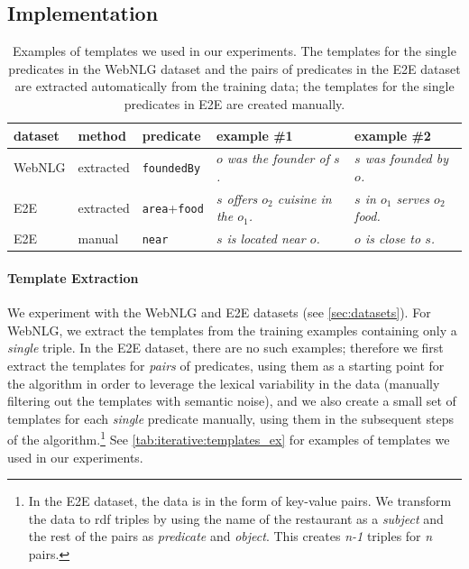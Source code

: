 \subsection{Implementation}
\label{sec:iterative:implementation}

\begin{table}[t]
    \centering\footnotesize
    \begin{tabular}{lllll}
        \textbf{dataset} & \textbf{method} & \textbf{predicate}          & \textbf{example \#1}                            & \textbf{example \#2}                     \\\midrule
        WebNLG           & extracted       & \texttt{foundedBy}          & \textit{$o$ was the founder of $s$.}            & \textit{$s$ was founded by $o$.}         \\
        E2E              & extracted       & \texttt{area}+\texttt{food} & \textit{$s$ offers $o_2$ cuisine in the $o_1$.} & \textit{$s$ in $o_1$ serves $o_2$ food.} \\
        E2E              & manual          & \texttt{near}               & \textit{$s$ is located near $o$.}               & \textit{$o$ is close to $s$.}
    \end{tabular}
    \caption{Examples of templates we used in our experiments. The templates for the single predicates in the WebNLG dataset and the pairs of predicates in the E2E dataset are extracted automatically from the training data; the templates for the single predicates in E2E are created manually.}
    \label{tab:iterative:templates_ex}
\end{table}


\paragraph{Template Extraction} We experiment with the WebNLG and E2E datasets (see \autoref{sec:datasets}). For WebNLG, we extract the templates from the training examples containing only a \textit{single} triple. In the E2E dataset, there are no such examples; therefore we first extract the templates for \textit{pairs} of predicates, using them as a starting point for the algorithm in order to leverage the lexical variability in the data (manually filtering out the templates with semantic noise), and we also create a small set of templates for each \textit{single} predicate manually, using them in the subsequent steps of the algorithm.\footnote{In the E2E dataset, the data is in the form of key-value pairs. We transform the data to \ac{rdf} triples by using the name of the restaurant as a \textit{subject} and the rest of the pairs as \textit{predicate} and \textit{object}. This creates \textit{n-1} triples for \textit{n} pairs.} See \autoref{tab:iterative:templates_ex} for examples of templates we used in our experiments.

